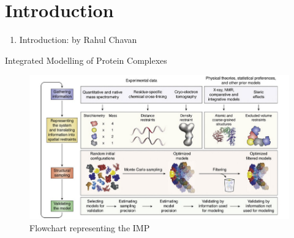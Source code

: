 \section*{Introduction}

\begin{frame}
    \begin{enumerate}
        \item Introduction: by Rahul Chavan
    \end{enumerate}
    
\end{frame}

\begin{frame}{Integrated Modelling of Protein Complexes}
    \begin{figure}
        \centering
        \includegraphics[width=1\textwidth]{images/imp.png}
        \caption{Flowchart representing the IMP}
        \label{fig:my_label}
    \end{figure}
\end{frame}

